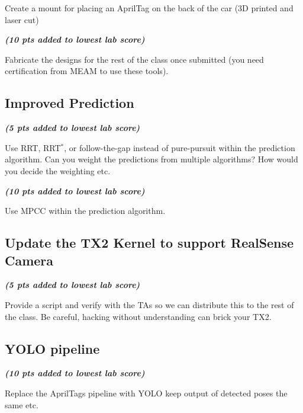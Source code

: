 \documentclass[letta4 paper]{article}
\begin{document}
\noindent Create a mount for placing an AprilTag on the back of the car (3D printed and laser cut)
\newline

\noindent\textit{\textbf{(10 pts added to lowest lab score)}}

\noindent Fabricate the designs for the rest of the class once submitted (you need certification from MEAM to use these tools). 

\subsection{Improved Prediction} \textit{\textbf{(5 pts added to lowest lab score)}}

\noindent Use RRT, RRT$^{*}$, or follow-the-gap instead of pure-pursuit within the prediction algorithm. Can you weight the predictions from multiple algorithms? How would you decide the weighting etc. 
\newline

\noindent\textit{\textbf{(10 pts added to lowest lab score)}}

\noindent Use MPCC within the prediction algorithm. 

\subsection{Update the TX2 Kernel to support RealSense Camera} \textit{\textbf{(5 pts added to lowest lab score)}}

\noindent Provide a script and verify with the TAs so we can distribute this to the rest of the class. Be careful, hacking without understanding can brick your TX2. 

\subsection{YOLO pipeline}\textit{\textbf{(10 pts added to lowest lab score)}}

\noindent Replace the AprilTags pipeline with YOLO keep output of detected poses the same etc. 
\end{document}
